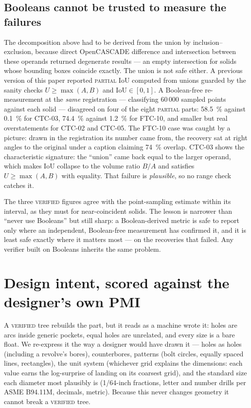 \documentclass[11pt]{article}
\newcommand{\VERIFIED}{\textsc{verified}}
\newcommand{\PARTIAL}{\textsc{partial}}
\begin{document}
\subsection{Booleans cannot be trusted to measure the failures}
\label{sec:booleans}
The decomposition above had to be derived from the union by
inclusion--exclusion, because direct OpenCASCADE difference and intersection
between these operands returned degenerate results --- an empty intersection
for solids whose bounding boxes coincide exactly. The union is not safe either.
A previous version of this paper reported \PARTIAL{} IoU computed from unions
guarded by the sanity checks $U \ge \max(A,B)$ and $\mathrm{IoU}\in[0,1]$.
A Boolean-free re-measurement at the \emph{same} registration --- classifying
60\,000 sampled points against each solid --- disagreed on four of the eight
\PARTIAL{} parts: \SI{58.5}{\percent} against \SI{0.1}{\percent} for CTC-03,
\SI{74.4}{\percent} against \SI{1.2}{\percent} for FTC-10, and smaller but real
overstatements for CTC-02 and CTC-05. The FTC-10 case was caught by a picture:
drawn in the registration its number came from, the recovery sat at right angles
to the original under a caption claiming \SI{74}{\percent} overlap. CTC-03 shows the characteristic signature: the ``union'' came back
equal to the larger operand, which makes IoU collapse to the volume ratio
$B/A$ and satisfies $U \ge \max(A,B)$ with equality. That failure is
\emph{plausible}, so no range check catches it.

The three \VERIFIED{} figures agree with the point-sampling estimate within its
interval, as they must for near-coincident solids. The lesson is narrower than
``never use Booleans'' but still sharp: a Boolean-derived metric is safe to
report only where an independent, Boolean-free measurement has confirmed it,
and it is least safe exactly where it matters most --- on the recoveries that
failed. Any verifier built on Booleans inherits the same problem.

\section{Design intent, scored against the designer's own PMI}
\label{sec:intent}

A \VERIFIED{} tree rebuilds the part, but it reads as a machine wrote it: holes
are arcs inside generic pockets, equal holes are unrelated, and every size is a
bare float. We re-express it the way a designer would have drawn it --- holes as
holes (including a revolve's bores), counterbores, patterns (bolt circles,
equally spaced lines, rectangles), the unit system (whichever grid explains the
dimensions: each value earns the log-surprise of landing on its coarsest grid),
and the standard size each diameter most plausibly is (1/64-inch
fractions, letter and number drills per ASME B94.11M, decimals, metric). Because
this never changes geometry it cannot break a \VERIFIED{} tree.
\end{document}
